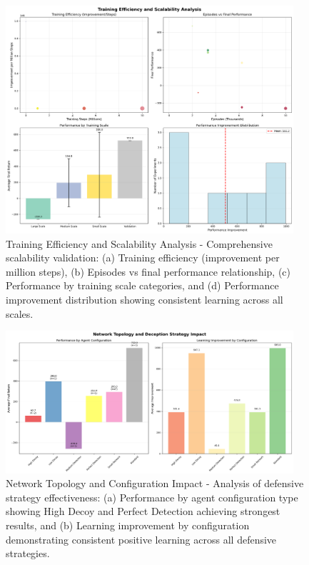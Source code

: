 \documentclass[11pt]{article}
\theoremstyle{definition}
\theoremstyle{plain}
\begin{document}
\begin{figure}[H]
\centering
\includegraphics[width=0.95\textwidth]{../TRAINING_EFFICIENCY_SCALABILITY.png}
\caption{Training Efficiency and Scalability Analysis - Comprehensive scalability validation: (a) Training efficiency (improvement per million steps), (b) Episodes vs final performance relationship, (c) Performance by training scale categories, and (d) Performance improvement distribution showing consistent learning across all scales.}
\label{fig:scalability_analysis}
\end{figure}

\begin{figure}[H]
\centering
\includegraphics[width=0.95\textwidth]{../NETWORK_TOPOLOGY_IMPACT_ANALYSIS.png}
\caption{Network Topology and Configuration Impact - Analysis of defensive strategy effectiveness: (a) Performance by agent configuration type showing High Decoy and Perfect Detection achieving strongest results, and (b) Learning improvement by configuration demonstrating consistent positive learning across all defensive strategies.}
\label{fig:topology_analysis}
\end{figure}
\end{document}

